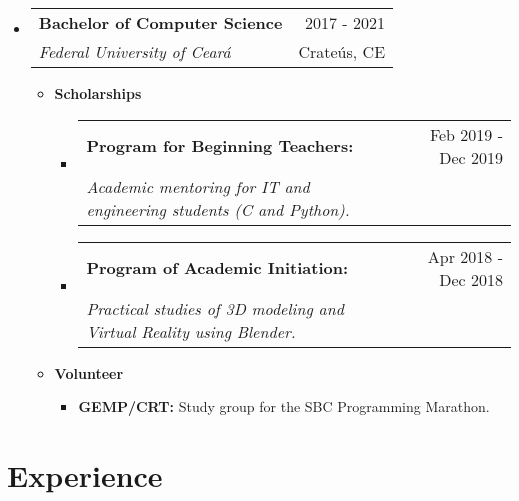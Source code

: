 \documentclass[letterpaper,11pt]{article}
\makeatletter
\newcommand{\resumeSubheading}[4]{
    \vspace{-1pt}\item
        \begin{tabular*}{0.97\textwidth}{l@{\extracolsep{\fill}}r}
            \textbf{#1} & #2 \\
            \textit{\small#3} & \small #4 \\
        \end{tabular*}
    \vspace{-5pt}
}
\newcommand{\resumeScholarship}[4]{
    \vspace{-1pt}\item
        \begin{tabular*}{0.89\textwidth}{l@{\extracolsep{\fill}}r}
            \textbf{\small#1} & #2 \\
            \textit{\small#3} & \small #4 \\
        \end{tabular*}\vspace{-5pt}
    \vspace{0.3cm}
}
\newcommand{\resumeSubHeadingListStart}{\begin{itemize}[leftmargin=*]}
\newcommand{\resumeSubHeadingListEnd}{\end{itemize}}
\makeatother
\begin{document}
    \resumeSubHeadingListStart
        \resumeSubheading
        {Bachelor of Computer Science}{\faCalendar \hspace{0.1cm} 2017 - 2021}
        {Federal University of Ceará}{\faMapMarker \hspace{0.1cm} Crateús, CE}
        \begin{itemize}
            \item \textbf{Scholarships}
                \begin{itemize}
                    \resumeScholarship
                    {Program for Beginning Teachers:}{\faCalendar \hspace{0.1cm} \small Feb 2019 - Dec 2019}
                    {Academic mentoring for IT and engineering students (C and Python).}{}
            
                    \resumeScholarship
                    {Program of Academic Initiation:}{\faCalendar \hspace{0.1cm} \small Apr 2018 - Dec 2018}
                    {Practical studies of 3D modeling and Virtual Reality using Blender.}{}
        
                \end{itemize}
        \end{itemize}
        
        \vspace{-0.2cm}
      
        \begin{itemize}
            \item \textbf{Volunteer}
                \begin{itemize}
                    \item \textbf{GEMP/CRT:} Study group for the SBC Programming Marathon. \href{https://github.com/GEMP-UFC-Crateus}{\scriptsize \faExternalLink}
                \end{itemize}
                \vspace{0.05cm}
        \end{itemize}
    \resumeSubHeadingListEnd

\section{\faBriefcase \hspace{0.2cm} \Large Experience}
\end{document}

